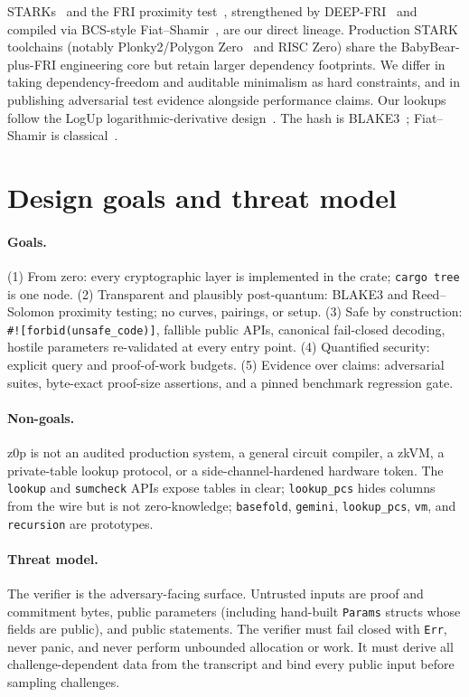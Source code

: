 \documentclass[11pt,a4paper]{article}
\begin{document}
STARKs~\cite{BBHR18a} and the FRI proximity test~\cite{BBHR18b},
strengthened by DEEP-FRI~\cite{BBHR19} and compiled via BCS-style
Fiat--Shamir~\cite{BCS16}, are our direct lineage. Production STARK
toolchains (notably Plonky2/Polygon Zero~\cite{Pol22} and RISC Zero) share
the BabyBear-plus-FRI engineering core but retain larger dependency
footprints. We differ in taking dependency-freedom and auditable minimalism
as hard constraints, and in publishing adversarial test evidence alongside
performance claims. Our lookups follow the LogUp logarithmic-derivative
design~\cite{Hab22}. The hash is BLAKE3~\cite{BLAKE3}; Fiat--Shamir is
classical~\cite{FS86}.

\section{Design goals and threat model}

\paragraph{Goals.} (1) From zero: every cryptographic layer is implemented in
the crate; \texttt{cargo tree} is one node. (2) Transparent and plausibly
post-quantum: BLAKE3 and Reed--Solomon proximity testing; no curves, pairings,
or setup. (3) Safe by construction: \texttt{\#![forbid(unsafe\_code)]},
fallible public APIs, canonical fail-closed decoding, hostile parameters
re-validated at every entry point. (4) Quantified security: explicit query and
proof-of-work budgets. (5) Evidence over claims: adversarial suites,
byte-exact proof-size assertions, and a pinned benchmark regression gate.

\paragraph{Non-goals.} z0p is not an audited production system, a general
circuit compiler, a zkVM, a private-table lookup protocol, or a
side-channel-hardened hardware token. The \texttt{lookup} and
\texttt{sumcheck} APIs expose tables in clear; \texttt{lookup\_pcs} hides
columns from the wire but is not zero-knowledge; \texttt{basefold},
\texttt{gemini}, \texttt{lookup\_pcs}, \texttt{vm}, and \texttt{recursion}
are prototypes.

\paragraph{Threat model.} The verifier is the adversary-facing surface.
Untrusted inputs are proof and commitment bytes, public parameters
(including hand-built \texttt{Params} structs whose fields are public), and
public statements. The verifier must fail closed with \texttt{Err}, never
panic, and never perform unbounded allocation or work. It must derive all
challenge-dependent data from the transcript and bind every public input
before sampling challenges.
\end{document}
